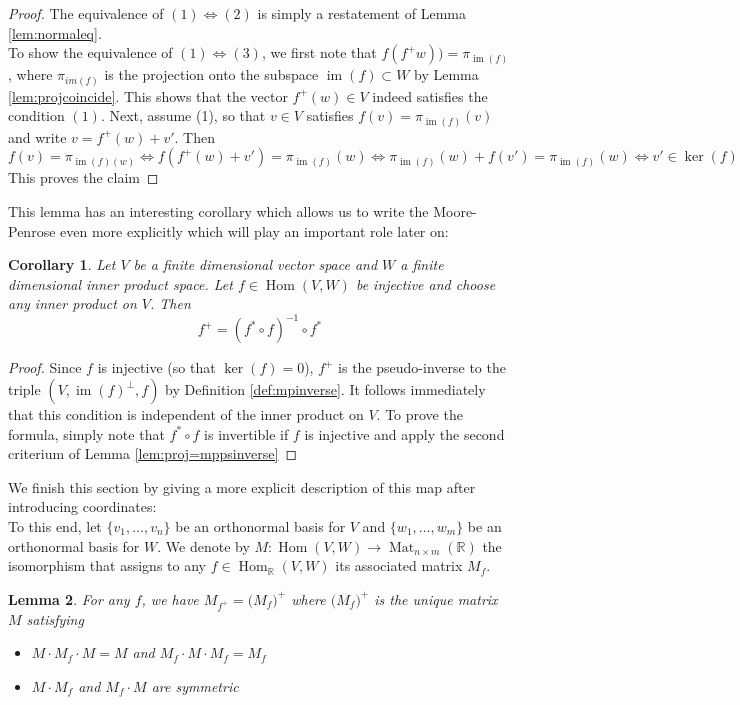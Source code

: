 \documentclass{book}
\theoremstyle{plain}
\newtheorem{corollary}{Corollary}[subsection]
\newtheorem{lemma}[corollary]{Lemma}
\theoremstyle{definition}
\renewcommand{\d}[1]{\mathbb{#1}}
\DeclareMathOperator{\Hom}{Hom}
\DeclareMathOperator{\im}{im}
\DeclareMathOperator{\Mat}{Mat}
\newcommand{\mor}{\longrightarrow}
\begin{document}
\begin{proof}
	The equivalence of $(1)\iff (2)$ is simply a restatement of Lemma \ref{lem:normaleq}.\\
	To show the equivalence of $(1)\iff (3)$, we first note that $f(f^+w))=\pi_{\im(f)}$, where $\pi_{im(f)}$ is the projection onto the subspace $\im(f)\subset W$ by Lemma \ref{lem:projcoincide}. This shows that the vector $f^+(w) \in V$ indeed satisfies the condition $(1)$. Next, assume (1), so that $v \in V$ satisfies $f(v)=\pi_{\im(f)}(v)$ and write $v= f^+(w)+v'$. Then\[
	f(v)=\pi_{\im(f)(w)}\iff f(f^+(w)+v')=\pi_{\im(f)}(w)\iff \pi_{\im(f)}(w)+f(v')=\pi_{\im(f)}(w)\iff v'\in \ker(f)
	\]
	This proves the claim
\end{proof}

This lemma has an interesting corollary which allows us to write the Moore-Penrose even more explicitly which will play an important role later on:

\begin{corollary}\label{cor:psinverse-injective}
Let $V$ be a finite dimensional vector space and $W$ a finite dimensional inner product space. Let $f \in \Hom(V,W)$ be injective and choose \emph{any} inner product on $V$. Then
\[
f^+ = (f^*\circ f)^{-1}\circ f^*
\] 
\end{corollary}

\begin{proof}
	Since $f$ is injective (so that $\ker(f)=0$), $f^+$ is the pseudo-inverse to the triple $(V,\im(f)^{\perp},f)$ by Definition \ref{def:mpinverse}. It follows immediately that this condition is independent of the inner product on $V$. To prove the formula, simply note that $f^*\circ f$ is invertible if $f$ is injective and apply the second criterium of Lemma \ref{lem:proj=mppsinverse}
\end{proof}


\noindent We finish this section by giving a more explicit description of this map after introducing coordinates:\\
To this end, let $\big\{v_1,\ldots ,v_n \big\}$ be an orthonormal basis for $V$ and $\big\{w_1,\ldots, w_m\big\}$ be an orthonormal basis for $W$. We denote by $M: \Hom(V,W)\mor \Mat_{n\times m}(\d{R})$ the isomorphism that assigns to any $f \in \Hom_\d{R}(V,W)$ its associated matrix $M_f$.

\begin{lemma}\label{lem:mppscoordinates}
	For any $f$, we have $M_{f^+}=\big( M_f\big)^+$ where $ \big(M_f\big)^+$ is the unique matrix $M$ satisfying
	\begin{itemize}
		\item $M\cdot M_f \cdot M=M$ and $M_f \cdot M \cdot M_f=M_f$
		\item $M\cdot M_f$ and $M_f \cdot M$ are symmetric
	\end{itemize}
\end{lemma}
\end{document}
